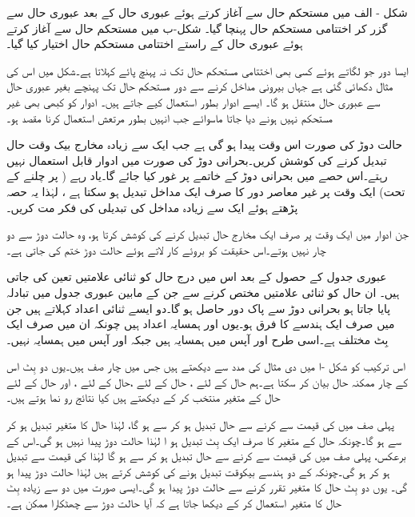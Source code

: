 شکل - الف میں مستحکم حال  سے آغاز کرتے ہوئے عبوری حال  کے بعد عبوری حال  سے گزر کر اختتامی مستحکم حال  پہنچا گیا۔ شکل-ب میں مستحکم حال  سے آغاز کرتے ہوئے عبوری حال  کے راستے اختتامی مستحکم حال  اختیار کیا گیا۔


 ایسا دور جو  لگاتے ہوئے کسی بھی اختتامی مستحکم حال تک نہ پہنچ پائے  کہلاتا ہے۔شکل  میں اس کی مثال دکھائی گئی ہے جہاں بیرونی مداخل  کرنے سے دور مستحکم حال تک پہنچے بغیر عبوری حال سے عبوری حال منتقل ہو گا۔	ایسے ادوار بطور استعمال کیے جاتے ہیں۔ ادوار کو کبھی بھی غیر مستحکم نہیں ہونے دیا جاتا ماسوائے جب انہیں بطور مرتعش استعمال کرنا مقصد ہو۔

حالت دوڑ کی صورت اس وقت پیدا ہو گی ہے جب ایک سے زیادہ مخارج بیک وقت حال تبدیل کرنے کی کوشش کریں۔بحرانی دوڑ کی صورت میں ادوار قابل استعمال نہیں رہتے۔اس حصے میں بحرانی دوڑ کے خاتمے پر غور کیا جائے گا۔یاد رہے ( پر چلنے کے تحت) ایک وقت پر غیر معاصر دور کا صرف ایک مداخل تبدیل ہو سکتا ہے ، لہٰذا یہ حصہ پڑھتے ہوئے ایک سے زیادہ مداخل کی تبدیلی کی فکر مت کریں۔

جن ادوار میں ایک وقت پر صرف ایک مخارج حال تبدیل کرنے کی کوشش کرتا ہو، وہ حالت دوڑ سے دو چار نہیں ہوتے۔اس حقیقت کو بروئے کار لاتے ہوئے حالت دوڑ ختم کی جاتی ہے۔

عبوری جدول کے حصول کے بعد اس میں درج حال کو ثنائی علامتیں تعین کی جاتی ہیں۔ ان حال کو  ثنائی علامتیں مختص کرنے سے جن کے مابین عبوری جدول میں تبادلہ پایا جاتا ہو بحرانی دوڑ سے پاک دور حاصل ہو گا۔دو ایسے ثنائی اعداد  کہلاتے ہیں جن میں صرف ایک ہندسے کا فرق ہو۔یوں  اور  ہمسایہ اعداد ہیں چونکہ ان میں صرف ایک بِٹ مختلف ہے۔اسی طرح  اور  آپس میں ہمسایہ ہیں جبکہ  اور  آپس میں ہمسایہ نہیں۔

اس ترکیب کو شکل -ا میں دی مثال کی مدد سے دیکھتے ہیں جس میں چار صف ہیں۔یوں دو بِٹ  اس کے چار ممکنہ حال بیان کر سکتا ہے۔ہم حال  کے لئے ، حال  کے لئے ،حال  کے لئے ، اور حال  کے لئے  حال کے متغیر منتخب کر کے دیکھتے ہیں کیا نتائج رو نما ہوتے ہیں۔

 پہلی صف میں  کی قیمت  سے  کرنے سے حال تبدیل ہو کر سے  ہو گا، لہٰذا حال کا متغیر  تبدیل ہو کر  سے  ہو گا۔چونکہ حال کے متغیر کا صرف ایک بِٹ تبدیل ہو ا لہٰذا حالت دوڑ پیدا نہیں ہو گی۔اس کے برعکس، پہلی صف میں  کی قیمت  سے  کرنے سے حال تبدیل ہو کر  سے  ہو گا لہٰذا  کی قیمت  سے تبدیل ہو کر  ہو گی۔چونکہ  کے دو ہندسے بیکوقت تبدیل ہونے کی کوشش کرتے ہیں لہٰذا حالت دوڑ پیدا ہو گی۔ یوں دو بِٹ حال کا متغیر تقرر کرنے سے حالت دوڑ پیدا ہو گی۔ایسی صورت میں دو سے زیادہ بِٹ حال کا متغیر استعمال کر کے دیکھا جاتا ہے کہ آیا حالت دوڑ سے چھٹکارا ممکن ہے۔

